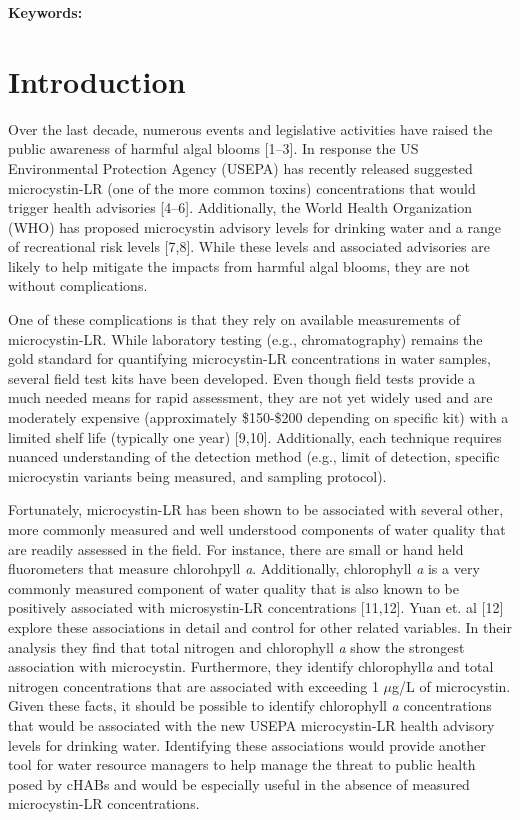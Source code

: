 \documentclass[10pt,a4paper,twocolumn]{article}
\begin{document}
\textbf{Keywords:}

\clearpage

\section{Introduction}\label{introduction}

Over the last decade, numerous events and legislative activities have
raised the public awareness of harmful algal blooms {[}1--3{]}. In
response the US Environmental Protection Agency (USEPA) has recently
released suggested microcystin-LR (one of the more common toxins)
concentrations that would trigger health advisories {[}4--6{]}.
Additionally, the World Health Organization (WHO) has proposed
microcystin advisory levels for drinking water and a range of
recreational risk levels {[}7,8{]}. While these levels and associated
advisories are likely to help mitigate the impacts from harmful algal
blooms, they are not without complications.

One of these complications is that they rely on available measurements
of microcystin-LR. While laboratory testing (e.g., chromatography)
remains the gold standard for quantifying microcystin-LR concentrations
in water samples, several field test kits have been developed. Even
though field tests provide a much needed means for rapid assessment,
they are not yet widely used and are moderately expensive (approximately
\$150-\$200 depending on specific kit) with a limited shelf life
(typically one year) {[}9,10{]}. Additionally, each technique requires
nuanced understanding of the detection method (e.g., limit of detection,
specific microcystin variants being measured, and sampling protocol).

Fortunately, microcystin-LR has been shown to be associated with several
other, more commonly measured and well understood components of water
quality that are readily assessed in the field. For instance, there are
small or hand held fluorometers that measure chlorohpyll \emph{a}.
Additionally, chlorophyll \emph{a} is a very commonly measured component
of water quality that is also known to be positively associated with
microsystin-LR concentrations {[}11,12{]}. Yuan et. al {[}12{]} explore
these associations in detail and control for other related variables. In
their analysis they find that total nitrogen and chlorophyll \emph{a}
show the strongest association with microcystin. Furthermore, they
identify chlorophyll\emph{a} and total nitrogen concentrations that are
associated with exceeding 1 \(\mu\)g/L of microcystin. Given these
facts, it should be possible to identify chlorophyll \emph{a}
concentrations that would be associated with the new USEPA
microcystin-LR health advisory levels for drinking water. Identifying
these associations would provide another tool for water resource
managers to help manage the threat to public health posed by cHABs and
would be especially useful in the absence of measured microcystin-LR
concentrations.
\end{document}
